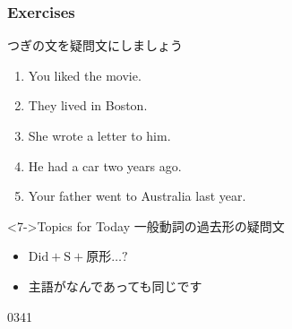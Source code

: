 \documentclass[aspectratio=169,xcolor={dvipsnames,table}]{beamer}
\newcommand{\myaudio}[1]{\href{#1}{\faVolumeUp}}
\begin{document}
\begin{frame}[plain]\frametitle{Exercises}

\small {つぎの文を疑問文にしましょう}

 \begin{enumerate}
  \item<1-> You liked the movie.\hspace{59.7pt}
  \item<1-> They lived in Boston.\hspace{62pt}%
  \item<1-> She wrote a letter to him.\hspace{42pt}%
  \item<1-> He had  a car two years ago.\hspace{30.5pt}%
  \item<1-> Your father went to  Australia last year.\\
 \mbox{}\hfill{}
 \end{enumerate}

\begin{block}<7->{Topics for Today}
\small
一般動詞の過去形の疑問文
\begin{itemize}[square]
 \item  \textcolor{NavyBlue}{\bfseries $\text{Did} + \text{S} + \text{原形} \ldots ?$}
 \item  主語がなんであっても同じです
\end{itemize}
      \end{block}

\vspace{-10pt}
\mbox{}\hfill{\tiny 0341}\,{\scriptsize \myaudio{./audio/027_past_did_you_04.mp3}}
\end{frame}
\end{document}
